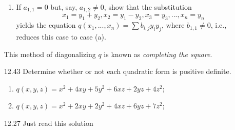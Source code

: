 \documentclass[12pt]{article}
\theoremstyle{definition}
\theoremstyle{plain}
\begin{document}
\begin{enumerate}
\begin{enumerate}
	\item If $a_{1,1}=0$ but, say, $a_{1,2}\neq 0$, show that the substitution
	\[ x_1=y_1+y_2,x_2=y_1-y_2,x_3=y_3,...,x_n=y_n \]
	yields the equation $q(x_1,...,x_n)=\sum b_{i,j}y_iy_j$, where $b_{1,1}\neq 0$, i.e., reduces this case to case (a).
	\end{enumerate}
	This method of diagonalizing $q$ is known as \textit{completing the square}.
\item[12.43]Determine whether or not each quadratic form is positive definite.
	\begin{enumerate}
	\item $q(x,y,z)=x^2+4xy+5y^2+6xz+2yz+4z^2$;
	\item $q(x,y,z)=x^2+2xy+2y^2+4xz+6yz+7z^2$;
	\end{enumerate}

\item[12.27]Just read this solution










\end{enumerate}
\end{document}
